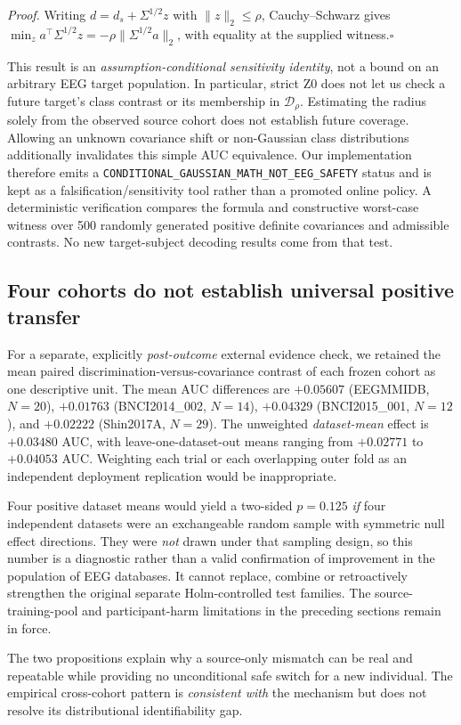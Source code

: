 \emph{Proof.}
Writing $d=d_s+\Sigma^{1/2}z$ with $\|z\|_2\le\rho$,
Cauchy--Schwarz gives
$\min_z a^\top\Sigma^{1/2}z=-\rho\|\Sigma^{1/2}a\|_2$,
with equality at the supplied witness.\hfill$\square$

This result is an \emph{assumption-conditional sensitivity
identity}, not a bound on an arbitrary EEG target population.
In particular, strict Z0 does not let us check a future target's
class contrast or its membership in $\mathcal D_\rho$.
Estimating the radius solely from the observed source cohort
does not establish future coverage. Allowing an unknown covariance
shift or non-Gaussian class distributions additionally invalidates
this simple AUC equivalence. Our implementation therefore emits a
\texttt{CONDITIONAL\_GAUSSIAN\_MATH\_NOT\_EEG\_SAFETY} status
and is kept as a falsification/sensitivity tool rather than a
promoted online policy. A deterministic verification compares
the formula and constructive worst-case witness over 500 randomly
generated positive definite covariances and admissible contrasts.
No new target-subject decoding results come from that test.

\subsection{Four cohorts do not establish universal positive transfer}
\label{sec:v15-four-cohorts}
For a separate, explicitly \emph{post-outcome} external evidence
check, we retained the mean paired discrimination-versus-covariance
contrast of each frozen cohort as one descriptive unit.
The mean AUC differences are $+0.05607$ (EEGMMIDB,
$N=20$), $+0.01763$ (BNCI2014\_002, $N=14$),
$+0.04329$ (BNCI2015\_001, $N=12$), and
$+0.02222$ (Shin2017A, $N=29$). The unweighted
\emph{dataset-mean} effect is $+0.03480$ AUC, with
leave-one-dataset-out means ranging from $+0.02771$ to
$+0.04053$ AUC. Weighting each trial or each overlapping
outer fold as an independent deployment replication would
be inappropriate.

Four positive dataset means would yield a two-sided
$p=0.125$ \emph{if} four independent datasets were
an exchangeable random sample with symmetric null
effect directions. They were \emph{not} drawn under that
sampling design, so this number is a diagnostic
rather than a valid confirmation of improvement in
the population of EEG databases. It cannot replace,
combine or retroactively strengthen the original
separate Holm-controlled test families. The
source-training-pool and participant-harm limitations
in the preceding sections remain in force.

The two propositions explain why a source-only mismatch
can be real and repeatable while providing no
unconditional safe switch for a new individual.
The empirical cross-cohort pattern is
\emph{consistent with} the mechanism but does
not resolve its distributional identifiability gap.
